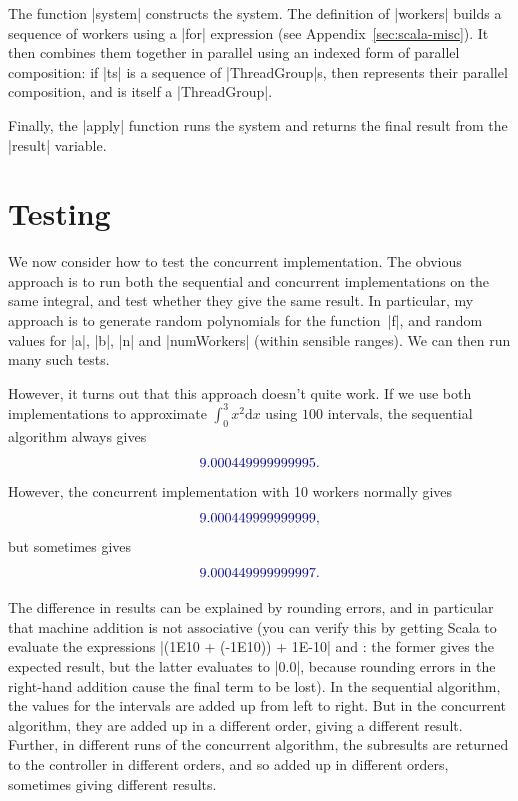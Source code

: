 The function |system| constructs the system.  The definition of |workers|
builds a sequence of workers using a |for| expression (see
Appendix~\ref{sec:scala-misc}).  It then combines them together in parallel
using an indexed form of parallel composition: if |ts| is a sequence of
|ThreadGroup|s, then  represents their
parallel composition, and is itself a |ThreadGroup|.

Finally, the |apply| function runs the system and returns the final result
from the |result| variable. 


\section{Testing}

We now consider how to test the concurrent implementation.  The
obvious approach is to run both the sequential and concurrent implementations
on the same integral, and test whether they give the same result.  In
particular, my approach is to generate random polynomials for the
function~|f|, and random values for |a|, |b|, |n| and |numWorkers| (within
sensible ranges).  We can then run many such tests.

However, it turns out that this approach doesn't quite work.  If we use both
implementations to approximate $\int_0^3 x^2 \mbox{d}x$ using $100$ intervals,
the sequential algorithm always gives
\[\mstyle
  9.000449999999995.
\]
However,  the concurrent implementation with 10 workers normally gives
\[\mstyle
  9.000449999999999,
\]
but sometimes gives
\[\mstyle
  9.000449999999997.
\]


The difference in results can be explained by rounding errors, and in
particular that machine addition is not associative (you can verify this by
getting Scala to evaluate the expressions |(1E10 + (-1E10)) + 1E-10| and
: the former gives the expected result, but the
latter evaluates to |0.0|, because rounding errors in the right-hand addition
cause the final term to be lost).
%
In the sequential algorithm, the values for the intervals are added up from
left to right.  But in the concurrent algorithm, they are added up in a
different order, giving a different result.  Further, in different runs of the
concurrent algorithm, the subresults are returned to the controller in
different orders, and so added up in different orders, sometimes giving
different results.

